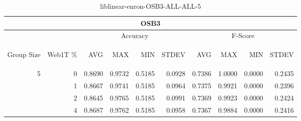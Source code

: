 \begin{center}
\begin{table}[htbp] 
 \begin{center}
\begin{tabular}{ | r | r | r | r | r | r | r | r | r | r |}
\hline
\multicolumn{10}{|c|}{OSB3}\\
\hline
 & & \multicolumn{4}{|c|}{Accuracy} & \multicolumn{4}{|c|}{F-Score}\\ \cline{3-10}
\begin{sideways}Group Size\end{sideways} & \begin{sideways}Web1T \%\end{sideways} & \begin{sideways}AVG\end{sideways} & \begin{sideways}MAX\end{sideways} & \begin{sideways}MIN\end{sideways} & \begin{sideways}STDEV\end{sideways} & \begin{sideways}AVG\end{sideways} & \begin{sideways}MAX\end{sideways} & \begin{sideways}MIN\end{sideways} & \begin{sideways}STDEV\end{sideways}\\
\hline
\multirow{3}{*}{5}
 & 0 & 0.8690 & 0.9732 & 0.5185 & 0.0928 & 0.7386 & 1.0000 & 0.0000 & 0.2435\\ \cline{2-10}
 & 1 & 0.8667 & 0.9741 & 0.5185 & 0.0964 & 0.7375 & 0.9921 & 0.0000 & 0.2396\\ \cline{2-10}
 & 2 & 0.8645 & 0.9765 & 0.5185 & 0.0991 & 0.7369 & 0.9923 & 0.0000 & 0.2424\\ \cline{2-10}
 & 4 & 0.8687 & 0.9762 & 0.5185 & 0.0958 & 0.7367 & 0.9884 & 0.0000 & 0.2416\\ \cline{2-10}
\hline
\end{tabular}
\caption{liblinear-enron-OSB3-ALL-ALL-5}
\label{table:liblinear-enron-OSB3-ALL-ALL-5}
\end{center}
 \end{table}
\end{center}


